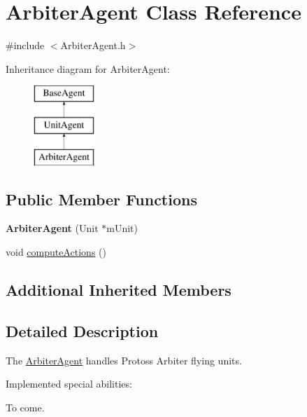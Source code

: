 \hypertarget{class_arbiter_agent}{\section{Arbiter\-Agent Class Reference}
\label{class_arbiter_agent}
}


{\ttfamily \#include $<$Arbiter\-Agent.\-h$>$}

Inheritance diagram for Arbiter\-Agent\-:\begin{figure}[H]
\begin{center}
\leavevmode
\includegraphics[height=3.000000cm]{class_arbiter_agent}
\end{center}
\end{figure}
\subsection*{Public Member Functions}
\begin{DoxyCompactItemize}
\item 
\hypertarget{class_arbiter_agent_a534b05b064a79c164947713bd9978f14}{{\bfseries Arbiter\-Agent} (Unit $\ast$m\-Unit)}\label{class_arbiter_agent_a534b05b064a79c164947713bd9978f14}

\item 
void \hyperlink{class_arbiter_agent_ae154eab7bfdf7c07601412b457467371}{compute\-Actions} ()
\end{DoxyCompactItemize}
\subsection*{Additional Inherited Members}


\subsection{Detailed Description}
The \hyperlink{class_arbiter_agent}{Arbiter\-Agent} handles Protoss Arbiter flying units.

Implemented special abilities\-:
\begin{DoxyItemize}
\item To come.
\end{DoxyItemize}

